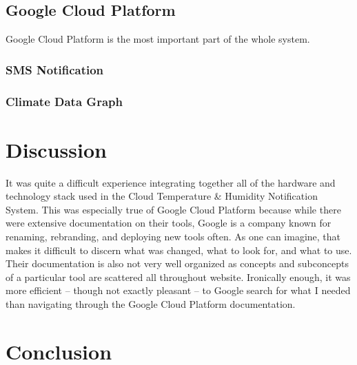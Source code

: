 \documentclass{article}
\begin{document}
\subsection{Google Cloud Platform }
\label{section:gcp}
Google Cloud Platform is the most important part of the whole system.

\subsubsection{SMS Notification}


\subsubsection{Climate Data Graph}

\section{Discussion}
It was quite a difficult experience integrating together all of the hardware and technology stack used in the Cloud Temperature \& Humidity Notification System. This was especially true of Google Cloud Platform because while there were extensive documentation on their tools, Google is a company known for renaming, rebranding, and deploying new tools often. As one can imagine, that makes it difficult to discern what was changed, what to look for, and what to use. Their documentation is also not very well organized as concepts and subconcepts of a particular tool are scattered all throughout website. Ironically enough, it was more efficient -- though not exactly pleasant -- to Google search for what I needed than navigating through the Google Cloud Platform documentation.

\section{Conclusion}
\end{document}
